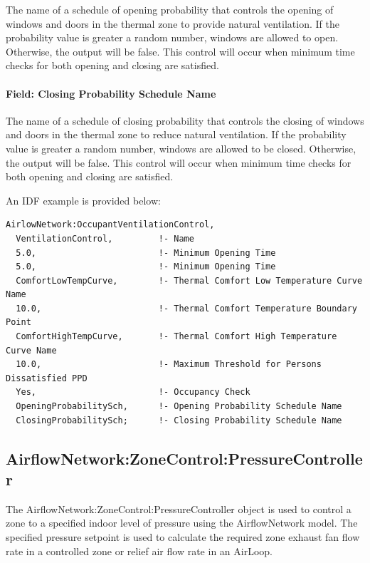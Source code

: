 The name of a schedule of opening probability that controls the opening of windows and doors in the thermal zone to provide natural ventilation. If the probability value is greater a random number, windows are allowed to open. Otherwise, the output will be false. This control will occur when minimum time checks for both opening and closing are satisfied.

\paragraph{Field: Closing Probability Schedule Name}\label{field-closing-probability-schedule-name}

The name of a schedule of closing probability that controls the closing of windows and doors in the thermal zone to reduce natural ventilation. If the probability value is greater a random number, windows are allowed to be closed. Otherwise, the output will be false. This control will occur when minimum time checks for both opening and closing are satisfied.

An IDF example is provided below:

\begin{lstlisting}
AirlowNetwork:OccupantVentilationControl,
  VentilationControl,         !- Name
  5.0,                        !- Minimum Opening Time
  5.0,                        !- Minimum Opening Time
  ComfortLowTempCurve,        !- Thermal Comfort Low Temperature Curve Name
  10.0,                       !- Thermal Comfort Temperature Boundary Point
  ComfortHighTempCurve,       !- Thermal Comfort High Temperature Curve Name
  10.0,                       !- Maximum Threshold for Persons Dissatisfied PPD
  Yes,                        !- Occupancy Check
  OpeningProbabilitySch,      !- Opening Probability Schedule Name
  ClosingProbabilitySch;      !- Closing Probability Schedule Name
\end{lstlisting}

\subsection{AirflowNetwork:ZoneControl:PressureController}\label{airflowNetworkzonecontrolpressureoontroller}

The AirflowNetwork:ZoneControl:PressureController object is used to control a zone to a specified indoor level of pressure using the AirflowNetwork model. The specified pressure setpoint is used to calculate the required zone exhaust fan flow rate in a controlled zone or relief air flow rate in an AirLoop.

